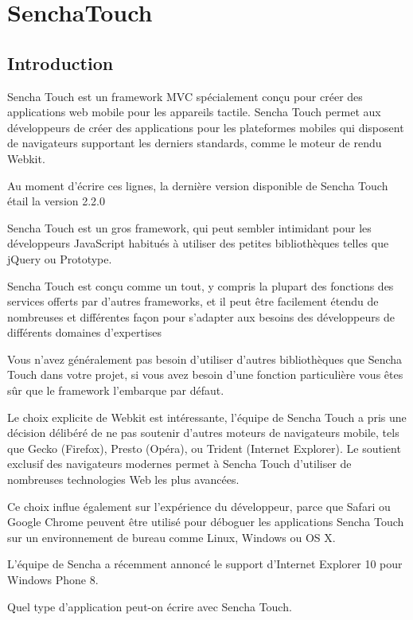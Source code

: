 \section{SenchaTouch}
\label{ch:senchaTouch}

\subsection{Introduction}

Sencha Touch est un framework MVC spécialement conçu pour créer des applications web mobile pour les appareils tactile. Sencha Touch permet aux développeurs de créer des applications pour les plateformes mobiles qui disposent de navigateurs supportant les derniers standards, comme le moteur de rendu Webkit.

Au moment d’écrire ces lignes, la dernière version disponible de Sencha Touch étail la version 2.2.0

Sencha Touch est un gros framework, qui peut sembler intimidant pour les développeurs JavaScript habitués à utiliser des petites bibliothèques telles que jQuery ou Prototype.

Sencha Touch est conçu comme un tout, y compris la plupart des fonctions des services offerts par d’autres frameworks, et il peut être facilement étendu de nombreuses et différentes façon pour s’adapter aux besoins des développeurs de différents domaines d’expertises

Vous n’avez généralement pas besoin d’utiliser d’autres bibliothèques que Sencha Touch dans votre projet, si vous avez besoin d’une fonction particulière vous êtes sûr que le framework l’embarque par défaut.

Le choix explicite de Webkit est intéressante, l’équipe de Sencha Touch a pris une décision délibéré de ne pas soutenir d’autres moteurs de navigateurs mobile, tels que Gecko (Firefox), Presto (Opéra), ou Trident (Internet Explorer). Le soutient exclusif des navigateurs modernes permet à Sencha Touch d’utiliser de nombreuses technologies Web les plus avancées.

Ce choix influe également sur l’expérience du développeur, parce que Safari ou Google Chrome peuvent être utilisé pour déboguer les applications Sencha Touch sur un environnement de bureau comme Linux, Windows ou OS X.

L’équipe de Sencha a récemment annoncé le support d'Internet Explorer 10 pour Windows Phone 8.

Quel type d’application peut-on écrire avec Sencha Touch.

